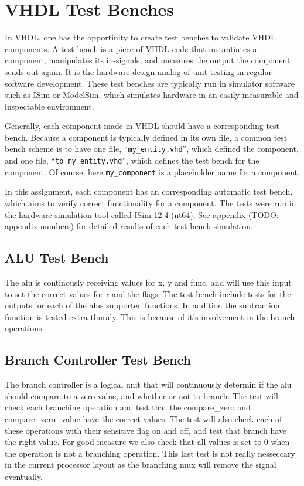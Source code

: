 \section{VHDL Test Benches}

In VHDL, one has the opportinity to create test benches to validate VHDL components.
A test bench is a piece of VHDL code that instantiates a component, manipulates its in-signals, and measures the output the component sends out again.
It is the hardware design analog of unit testing in regular software development.
These test benches are typically run in simulator software such as ISim or ModelSim, which simulates hardware in an easily measurable and inspectable environment.

Generally, each component made in VHDL should have a corresponding test bench.
Because a component is typically defined in its own file, a common test bench scheme is to have one file, ``\texttt{my\_entity.vhd}'', which defined the component, and one file, ``\texttt{tb\_my\_entity.vhd}'', which defines the test bench for the component.
Of course, here \texttt{my\_component} is a placeholder name for a component.

In this assignment, each component has an corresponding automatic test bench, which aims to verify correct functionality for a component.
The tests were run in the hardware simulation tool called ISim 12.4 (nt64).
See appendix (TODO: appendix numbers) for detailed results of each test bench simulation.

\subsection{ALU Test Bench}

The alu is continously receiving values for x, y and func, and will use this input to set the correct values for r and the flags.
The test bench include tests for the outputs for each of the alus supported functions.
In addition the subtraction function is tested extra thuraly.
This is because of it's involvement in the branch operations.

\subsection{Branch Controller Test Bench}

The branch controller is a logical unit that will continuously determin if the alu should compare to a zero value, and whether or not to branch.
The test will check each branching operation and test that the compare\_zero and compare\_zero\_value have the correct values.
The test will also check each of these operations with their sensitive flag on and off, and test that branch have the right value.
For good measure we also check that all values is set to 0 when the operation is not a branching operation.
This last test is not really nesseccary in the current processor layout as the branching mux will remove the signal eventually.


